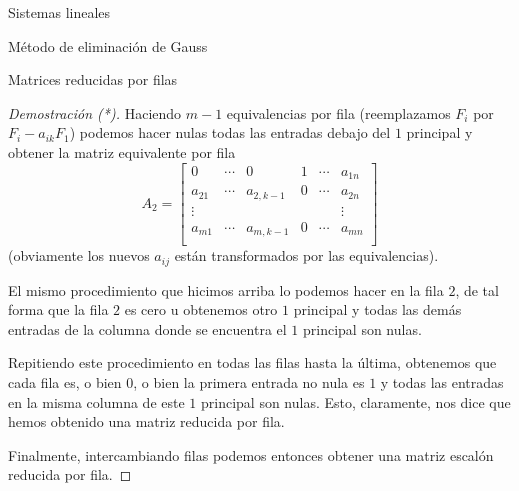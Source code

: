 \begin{chapter}{Sistemas lineales}
\begin{section}{Método de eliminación de Gauss }
\begin{subsection}{Matrices reducidas por filas}
\begin{proof}[Demostración (*)]
                    Haciendo $m-1$ equivalencias por fila (reemplazamos $F_i$ por $F_i - a_{ik}F_1$) podemos hacer nulas todas las entradas debajo del  $1$ principal y obtener la matriz equivalente por fila
                    \begin{equation*}
                    A_2 = \begin{bmatrix}
                    0 & \cdots & 0 & 1 & \cdots & a_{1n} \\
                    a_{21}& \cdots & a_{2,k-1} & 0 & \cdots & a_{2n} \\
                    \vdots&  &  &  &  & \vdots \\
                    a_{m1}& \cdots & a_{m,k-1} &0 & \cdots & a_{mn} \\
                    \end{bmatrix}
                    \end{equation*}
                    (obviamente los nuevos $a_{ij}$ están transformados por las equivalencias).
                    
                    El mismo procedimiento que hicimos arriba lo podemos hacer en la fila $2$,  de tal forma que la fila $2$ es cero u obtenemos otro $1$ principal y todas las demás entradas de la columna donde se encuentra el $1$ principal son nulas. 
                    
                    Repitiendo este procedimiento en todas las filas hasta la última, obtenemos que cada fila es, o bien 0, o bien la primera entrada no nula es  $1$ y todas las entradas en la misma columna de este $1$ principal son nulas.   Esto, claramente, nos dice que hemos obtenido una matriz reducida por fila.  
                    
                 Finalmente, intercambiando filas podemos entonces obtener una matriz escalón reducida por fila.

                
                \end{proof}
                

\end{subsection}
\end{section}
\end{chapter}

